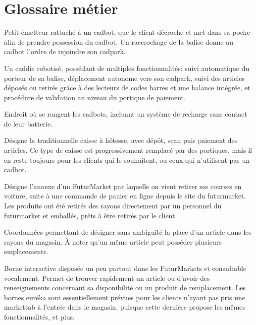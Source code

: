 \chapter{Glossaire métier}

Petit émetteur rattaché à un cadbot, que le client décroche et met dans sa poche afin de prendre possession du cadbot.
Un raccrochage de la balise donne au cadbot l'ordre de rejoindre son cadpark.
\par

Un caddie robotisé, possédant de multiples fonctionnalités: suivi automatique du porteur de sa balise, déplacement autonome vers son cadpark, suivi des articles déposés ou retirés grâce à des lecteurs de codes barres et une balance intégrée, et procédure de validation au niveau du portique de paiement.
\par

Endroit où se rangent les cadbots, incluant un système de recharge sans contact de leur batterie.
\par

Désigne la traditionnelle caisse à hôtesse, avec dépôt, scan puis paiement des articles.
Ce type de caisse est progressivement remplacé par des portiques, mais il en reste toujours pour les clients qui le souhaitent, ou ceux qui n'utilisent pas un cadbot.
\par

Désigne l'annexe d'un FuturMarket par laquelle on vient retirer ses courses en voiture, suite à une commande de panier en ligne depuis le site du futurmarket.
Les produits ont été retirés des rayons directement par un personnel du futurmarket et emballés, prêts à être retirés par le client.
\par

Coordonnées permettant de désigner sans ambiguïté la place d'un article dans les rayons du magasin.
À noter qu'un même article peut posséder plusieurs emplacements.
\par

Borne interactive disposée un peu partout dans les FuturMarkets et consultable vocalement.
Permet de trouver rapidement un article ou d'avoir des renseignements concernant sa disponibilité ou un produit de remplacement.
Les bornes euréka sont essentiellement prévues pour les clients n'ayant pas pris une markettab à l'entrée dans le magasin, puisque cette dernière propose les mêmes fonctionnalités, et plus.
\par

